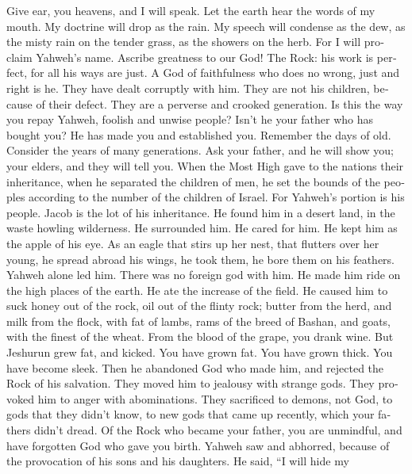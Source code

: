 \begin{paracol}{2}
\begin{otherlanguage}{english}
 Give ear, you heavens, and I will speak. Let the earth
hear the words of my mouth.  My doctrine will drop as the
rain. My speech will condense as the dew, as the misty rain on the
tender grass, as the showers on the herb.  For I will
proclaim Yahweh's name. Ascribe greatness to our God!  The
Rock: his work is perfect, for all his ways are just. A God of
faithfulness who does no wrong, just and right is he. 
They have dealt corruptly with him. They are not his children, because
of their defect. They are a perverse and crooked generation.
 Is this the way you repay Yahweh, foolish and unwise
people? Isn't he your father who has bought you? He has made you and
established you.  Remember the days of old. Consider the
years of many generations. Ask your father, and he will show you; your
elders, and they will tell you.  When the Most High gave
to the nations their inheritance, when he separated the children of men,
he set the bounds of the peoples according to the number of the children
of Israel.  For Yahweh's portion is his people. Jacob is
the lot of his inheritance.  He found him in a desert
land, in the waste howling wilderness. He surrounded him. He cared for
him. He kept him as the apple of his eye.  As an eagle
that stirs up her nest, that flutters over her young, he spread abroad
his wings, he took them, he bore them on his feathers. 
Yahweh alone led him. There was no foreign god with him. 
He made him ride on the high places of the earth. He ate the increase of
the field. He caused him to suck honey out of the rock, oil out of the
flinty rock;  butter from the herd, and milk from the
flock, with fat of lambs, rams of the breed of Bashan, and goats, with
the finest of the wheat. From the blood of the grape, you drank wine.
 But Jeshurun grew fat, and kicked. You have grown fat.
You have grown thick. You have become sleek. Then he abandoned God who
made him, and rejected the Rock of his salvation.  They
moved him to jealousy with strange gods. They provoked him to anger with
abominations.  They sacrificed to demons, not God, to
gods that they didn't know, to new gods that came up recently, which
your fathers didn't dread.  Of the Rock who became your
father, you are unmindful, and have forgotten God who gave you birth.
 Yahweh saw and abhorred, because of the provocation of
his sons and his daughters.  He said, ``I will hide my

\end{otherlanguage}
\end{paracol}
